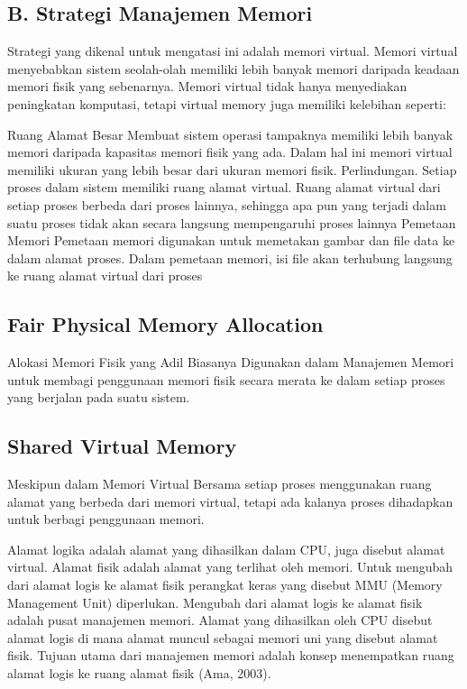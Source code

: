 \subsection {B. Strategi Manajemen Memori}
Strategi yang dikenal untuk mengatasi ini adalah memori virtual. Memori virtual menyebabkan sistem seolah-olah memiliki lebih banyak memori daripada keadaan memori fisik yang sebenarnya. Memori virtual tidak hanya menyediakan peningkatan komputasi, tetapi virtual memory juga memiliki kelebihan seperti:

Ruang Alamat Besar
Membuat sistem operasi tampaknya memiliki lebih banyak memori daripada kapasitas memori fisik yang ada. Dalam hal ini memori virtual memiliki ukuran yang lebih besar dari ukuran memori fisik.
Perlindungan.
Setiap proses dalam sistem memiliki ruang alamat virtual. Ruang alamat virtual dari setiap proses berbeda dari proses lainnya, sehingga apa pun yang terjadi dalam suatu proses tidak akan secara langsung mempengaruhi proses lainnya
Pemetaan Memori
Pemetaan memori digunakan untuk memetakan gambar dan file data ke dalam alamat proses. Dalam pemetaan memori, isi file akan terhubung langsung ke ruang alamat virtual dari proses

\subsection {Fair Physical Memory Allocation}
Alokasi Memori Fisik yang Adil Biasanya Digunakan dalam Manajemen Memori untuk membagi penggunaan memori fisik secara merata ke dalam setiap proses yang berjalan pada suatu sistem.

\subsection {Shared Virtual Memory}
Meskipun dalam Memori Virtual Bersama setiap proses menggunakan ruang alamat yang berbeda dari memori virtual, tetapi ada kalanya proses dihadapkan untuk berbagi penggunaan memori.\cite{kil2006address}

Alamat logika adalah alamat yang dihasilkan dalam CPU, juga disebut alamat virtual. Alamat fisik adalah alamat yang terlihat oleh memori. Untuk mengubah dari alamat logis ke alamat fisik perangkat keras yang disebut MMU (Memory Management Unit) diperlukan. Mengubah dari alamat logis ke alamat fisik adalah pusat manajemen memori. Alamat yang dihasilkan oleh CPU disebut alamat logis di mana alamat muncul sebagai memori uni yang disebut alamat fisik. Tujuan utama dari manajemen memori adalah konsep menempatkan ruang alamat logis ke ruang alamat fisik (Ama, 2003).

